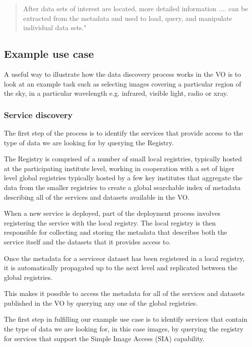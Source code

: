 \documentclass{article}
\begin{document}
\begin{quote}
After data sets of interest are located, more detailed information
.... can be extracted from the metadata and used to load, query, and
manipulate individual data sets."
\end{quote}

\subsection{Example use case}

A useful way to illustrate how the data discovery process works in the VO
is to look at an example task such as selecting images covering a particular
region of the sky, in a particular wavelength e.g. infrared, visible light,
radio or xray.

\subsubsection{Service discovery}

The first step of the process is to identify the services that provide access to
the type of data we are looking for by querying the Registry.

The Registry is comprised of a number of small local registries, typically
hosted at the participating institute level, working in cooperation with a set
of higer level global registries typically hosted by a few key institutes that
aggregate the data from the smaller registries to create a global searchable
index of metadata describing all of the services and datasets available in
the VO.

When a new service is deployed, part of the deployment process involves
registering the service with the local registry. The local registry is then
responsible for collecting and storing the metadata that describes both the
service itself and the datasets that it provides access to.

Once the metadata for a serviceor dataset has been registered in a local registry,
it is automatically propagated up to the next level and replicated between the
global registries.

This makes it possible to access the metadata for all of the services and datasets
published in the VO by querying any one of the global registries.

The first step in fulfilling our example use case is to identify services that
contain the type of data we are looking for, in this case images, by querying
the registry for services that support the Simple Image Access (SIA)
capability.
\end{document}
